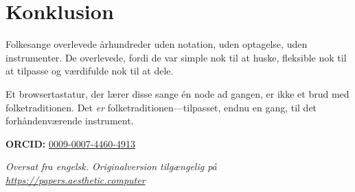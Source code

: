 \documentclass[11pt]{article}
\begin{document}
\section{Konklusion}

Folkesange overlevede århundreder uden notation, uden optagelse, uden instrumenter. De overlevede, fordi de var simple nok til at huske, fleksible nok til at tilpasse og værdifulde nok til at dele.

Et browsertastatur, der lærer disse sange én node ad gangen, er ikke et brud med folketraditionen. Det \emph{er} folketraditionen---tilpasset, endnu en gang, til det forhåndenværende instrument.

\vspace{0.5em}
\noindent\textbf{ORCID:} \href{https://orcid.org/0009-0007-4460-4913}{0009-0007-4460-4913}

\vspace{0.3em}
\noindent\textit{Oversat fra engelsk. Originalversion tilgængelig på \url{https://papers.aesthetic.computer}}



\end{document}
